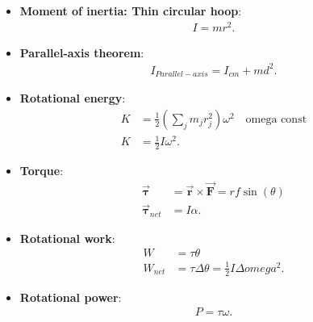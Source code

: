 \documentclass{report}
\begin{document}
\begin{itemize}
        \item \textbf{Moment of inertia: Thin circular hoop}:
            \begin{align*}
                I = mr^{2}
            .\end{align*}
        \item \textbf{Parallel-axis theorem}:
            \begin{align*}
                I_{Parallel-axis} = I_{cm} + md^{2}
            .\end{align*}
        \item \textbf{Rotational energy}:
            \begin{align*}
                K &= \frac{1}{2}\left(\sum_{j}m_{j}r_{j}^{2}\right)\omega^{2} \quad \text{omega const} \\
                K &= \frac{1}{2}I\omega^{2}
            .\end{align*}
        \item \textbf{Torque}:
            \begin{align*}
                \vec{\mathbf{\tau}} &= \vec{\mathbf{r}} \times \vec{\mathbf{F}} = rf\sin{\left(\theta \right)} \\
                \vec{\mathbf{\tau}}_{net} &= I\alpha
            .\end{align*}
        \item \textbf{Rotational work}:
            \begin{align*}
                W &= \tau \theta  \\
                W_{net} &= \tau\Delta \theta = \frac{1}{2}I\Delta omega^{2}
            .\end{align*}
        \item \textbf{Rotational power}:
            \begin{align*}
                P = \tau \omega
            .\end{align*}





\end{itemize}
\end{document}
